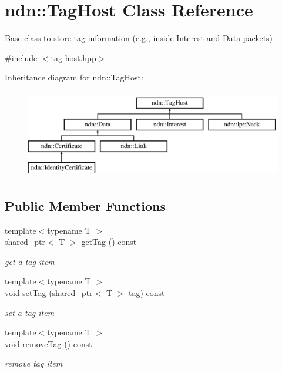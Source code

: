 \hypertarget{classndn_1_1TagHost}{}\section{ndn\+:\+:Tag\+Host Class Reference}
\label{classndn_1_1TagHost}


Base class to store tag information (e.\+g., inside \hyperlink{classndn_1_1Interest}{Interest} and \hyperlink{classndn_1_1Data}{Data} packets)  




{\ttfamily \#include $<$tag-\/host.\+hpp$>$}

Inheritance diagram for ndn\+:\+:Tag\+Host\+:\begin{figure}[H]
\begin{center}
\leavevmode
\includegraphics[height=3.862069cm]{classndn_1_1TagHost}
\end{center}
\end{figure}
\subsection*{Public Member Functions}
\begin{DoxyCompactItemize}
\item 
{\footnotesize template$<$typename T $>$ }\\shared\+\_\+ptr$<$ T $>$ \hyperlink{classndn_1_1TagHost_a6b0430435db7f26dc5be6262afed10bf}{get\+Tag} () const
\begin{DoxyCompactList}\small\item\em get a tag item \end{DoxyCompactList}\item 
{\footnotesize template$<$typename T $>$ }\\void \hyperlink{classndn_1_1TagHost_aa6f608ab7714c5ca6f099f942eedfa3a}{set\+Tag} (shared\+\_\+ptr$<$ T $>$ tag) const
\begin{DoxyCompactList}\small\item\em set a tag item \end{DoxyCompactList}\item 
{\footnotesize template$<$typename T $>$ }\\void \hyperlink{classndn_1_1TagHost_a02a42daab9735d666a073819ef605cfc}{remove\+Tag} () const
\begin{DoxyCompactList}\small\item\em remove tag item \end{DoxyCompactList}\end{DoxyCompactItemize}


